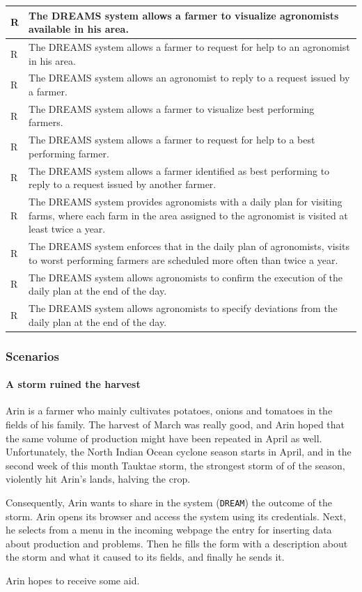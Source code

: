 \documentclass{article}
\begin{document}
\begin{longtable}[c]{|m{0.75cm}|m{11cm}|}
  \hline
  R & The DREAMS system allows a farmer to visualize agronomists available in his area.\\
  \hline
  R & The DREAMS system allows a farmer to request for help to an agronomist in his area.\\
  \hline
  R & The DREAMS system allows an agronomist to reply to a request issued by a farmer.\\
  \hline
  R &  The DREAMS system allows a farmer to visualize best performing farmers.\\
  \hline
  R & The DREAMS system allows a farmer to request for help to a best performing farmer.\\
  \hline
  R & The DREAMS system allows a farmer identified as best performing to reply to a request issued by another farmer.\\
  \hline
  R & The DREAMS system provides agronomists with a daily plan for visiting farms, where each farm in the area assigned to the agronomist is visited at least twice a year.\\
  \hline
  R & The DREAMS system enforces that in the daily plan of agronomists, visits to worst performing farmers are scheduled more often than twice a year.\\
  \hline
  R & The DREAMS system allows agronomists to confirm the execution of the daily plan at the end of the day.\\
  \hline
  R & The DREAMS system allows agronomists to specify deviations from the daily plan at the end of the day.\\
  \hline
  \end{longtable}
\subsubsection{Scenarios}
\paragraph{A storm ruined the harvest}
Arin is a farmer who mainly cultivates potatoes, onions and tomatoes in the fields of his family. The harvest of March was really good, and Arin hoped that the same volume of production might have been repeated in April as well. Unfortunately, the North Indian Ocean cyclone season starts in April, and in the second week of this month Tauktae storm, the strongest storm of of the season, violently hit Arin's lands, halving the crop.\par
\noindent Consequently, Arin wants to share in the system (\verb|DREAM|) the outcome of the storm. Arin opens its browser and access the system using its credentials. Next, he selects from a menu in the incoming webpage the entry for inserting data about production and problems. Then he fills the form with a description about the storm and what it caused to its fields, and finally he sends it.\par
\noindent Arin hopes to receive some aid.
\end{document}
